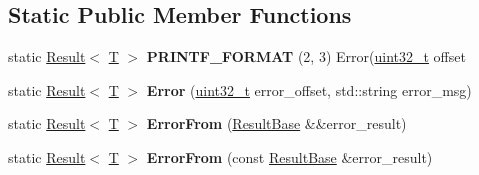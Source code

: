 \subsection*{Static Public Member Functions}
\begin{DoxyCompactItemize}
\item 
\mbox{\label{classv8_1_1internal_1_1wasm_1_1Result_ae843bdccd8080b66cec824f0906eaf7a}} 
static \mbox{\hyperlink{classv8_1_1internal_1_1wasm_1_1Result}{Result}}$<$ \mbox{\hyperlink{classv8_1_1internal_1_1torque_1_1T}{T}} $>$ {\bfseries P\+R\+I\+N\+T\+F\+\_\+\+F\+O\+R\+M\+AT} (2, 3) Error(\mbox{\hyperlink{classuint32__t}{uint32\+\_\+t}} offset
\item 
\mbox{\label{classv8_1_1internal_1_1wasm_1_1Result_aa438e7e8caf21d4029b56ca6bbfea056}} 
static \mbox{\hyperlink{classv8_1_1internal_1_1wasm_1_1Result}{Result}}$<$ \mbox{\hyperlink{classv8_1_1internal_1_1torque_1_1T}{T}} $>$ {\bfseries Error} (\mbox{\hyperlink{classuint32__t}{uint32\+\_\+t}} error\+\_\+offset, std\+::string error\+\_\+msg)
\item 
\mbox{\label{classv8_1_1internal_1_1wasm_1_1Result_ae21c5cb73157aba3af3898d4d5ca1a85}} 
static \mbox{\hyperlink{classv8_1_1internal_1_1wasm_1_1Result}{Result}}$<$ \mbox{\hyperlink{classv8_1_1internal_1_1torque_1_1T}{T}} $>$ {\bfseries Error\+From} (\mbox{\hyperlink{classv8_1_1internal_1_1wasm_1_1ResultBase}{Result\+Base}} \&\&error\+\_\+result)
\item 
\mbox{\label{classv8_1_1internal_1_1wasm_1_1Result_aaf8f1b3169a6a6d9e77c612dba5c60db}} 
static \mbox{\hyperlink{classv8_1_1internal_1_1wasm_1_1Result}{Result}}$<$ \mbox{\hyperlink{classv8_1_1internal_1_1torque_1_1T}{T}} $>$ {\bfseries Error\+From} (const \mbox{\hyperlink{classv8_1_1internal_1_1wasm_1_1ResultBase}{Result\+Base}} \&error\+\_\+result)
\end{DoxyCompactItemize}
